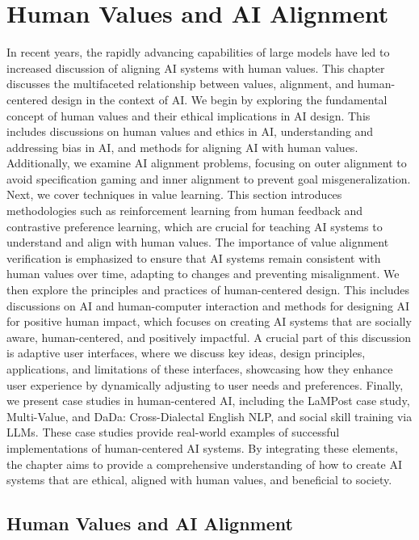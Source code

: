 \documentclass[
  letterpaper,
  numbers=noenddot,
  DIV=11]{scrreprt}
\let\oldchapter\chapter
\def\chapter{%
  \setcounter{sidenote}{1}%
  \oldchapter
}
\theoremstyle{plain}
\theoremstyle{definition}
\theoremstyle{plain}
\theoremstyle{remark}
\begin{document}

\chapter{Human Values and AI Alignment}\label{sec-human-ai-alginment}

In recent years, the rapidly advancing capabilities of large models have
led to increased discussion of aligning AI systems with human values.
This chapter discusses the multifaceted relationship between values,
alignment, and human-centered design in the context of AI. We begin by
exploring the fundamental concept of human values and their ethical
implications in AI design. This includes discussions on human values and
ethics in AI, understanding and addressing bias in AI, and methods for
aligning AI with human values. Additionally, we examine AI alignment
problems, focusing on outer alignment to avoid specification gaming and
inner alignment to prevent goal misgeneralization. Next, we cover
techniques in value learning. This section introduces methodologies such
as reinforcement learning from human feedback and contrastive preference
learning, which are crucial for teaching AI systems to understand and
align with human values. The importance of value alignment verification
is emphasized to ensure that AI systems remain consistent with human
values over time, adapting to changes and preventing misalignment. We
then explore the principles and practices of human-centered design. This
includes discussions on AI and human-computer interaction and methods
for designing AI for positive human impact, which focuses on creating AI
systems that are socially aware, human-centered, and positively
impactful. A crucial part of this discussion is adaptive user
interfaces, where we discuss key ideas, design principles, applications,
and limitations of these interfaces, showcasing how they enhance user
experience by dynamically adjusting to user needs and preferences.
Finally, we present case studies in human-centered AI, including the
LaMPost case study, Multi-Value, and DaDa: Cross-Dialectal English NLP,
and social skill training via LLMs. These case studies provide
real-world examples of successful implementations of human-centered AI
systems. By integrating these elements, the chapter aims to provide a
comprehensive understanding of how to create AI systems that are
ethical, aligned with human values, and beneficial to society.

\section{Human Values and AI
Alignment}\label{human-values-and-ai-alignment}
\end{document}
